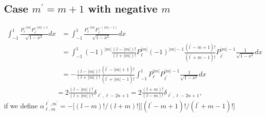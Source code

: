 \subsection{Case $m^{\prime}= m +1$ with negative $m$} %
\begin{align}
    \int_{-1}^{1} \frac{P_{\ell}^{-|m|} P_{\ell^{\prime}}^{-|m|+1}}{\sqrt{1-x^2}} dx &= \int_{-1}^{1} \frac{P_{\ell}^{-|m|} P_{\ell^{\prime}}^{-(|m|-1)}}{\sqrt{1-x^2}} dx \nonumber \\
    &= \int_{-1}^{1} (-1)^|m| \frac{(l-|m|)!}{(l+|m|)!} P_{\ell}^{|m|} (-1)^{|m|-1} \frac{(l^{\prime}-m+1)!}{(l^{\prime}+m-1)!} P_{\ell^{\prime}}^{|m|-1} \frac{1}{\sqrt{1-x^2}} dx \nonumber\\
    &= - \frac{(l-|m|)!}{(l+|m|)!} \frac{(l^{\prime}-|m|+1)!}{(l^{\prime}+|m|-1)!}  \int_{-1}^{1}   P_{\ell}^{|m|} P_{\ell^{\prime}}^{|m|-1} \frac{1}{\sqrt{1-x^2}} dx \nonumber
        \end{align}
\begin{align}
    &= 2\frac{(l-|m|)!}{(l+|m|)!} \delta_{\ell^{\prime},\ell-2n+1} =2\frac{(l+m)!}{(l-m)!} \delta_{\ell^{\prime},\ell-2n+1},
\end{align}
if we define $\alpha_{\ell,m}^{\ell^{\prime},m^{\prime}}=- \Big[(l-m)!\Big/(l+m)!\Big] \Big[ (l^{\prime}-m+1)!\Big/(l^{\prime}+m-1)!\Big]$

